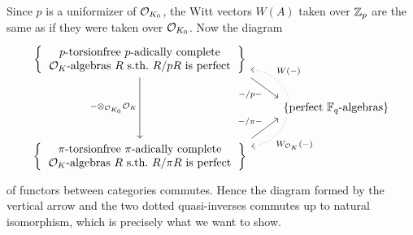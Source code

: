 \documentclass[a4paper, 10pt, oneside, DIV=9, chapterprefix=true, numbers=enddot,bibliography=totoc]{scrbook}
\begin{document}
\begin{proof*}
	Since $p$ is a uniformizer of $\mathcal{O}_{K_0}$, the Witt vectors $W(A)$ taken over $\mathbb{Z}_p$ are the same as if they were taken over $\mathcal{O}_{K_0}$. Now the diagram
	\begin{equation*}
		\begin{tikzcd}[row sep=normal]
			\left\{\begin{tabular}{c}
			$p$-torsionfree $p$-adically complete \\
			$\Oo_K$-algebras $R$ s.th.\ $R/p R$ is perfect
			\end{tabular}
			\right\}\ar[dd,"-\otimes_{\Oo_{K_0}}\Oo_K"{swap}]
			\drar[start anchor=south east, end anchor=north west, "-/p-"{swap}] & \\
			 & \left\{\text{perfect $\IF_q$-algebras}\right\}\ular[start anchor=168, end anchor=355, bend right, dotted, "W(-)"{swap}]\dlar[start anchor=192, end anchor=5, bend left, dotted, "W_{\Oo_K}(-)"]\\
			\left\{\begin{tabular}{c}
			$\pi$-torsionfree $\pi$-adically complete \\
			$\Oo_K$-algebras $R$ s.th.\ $R/\pi R$ is perfect
			\end{tabular}
			\right\}\urar[start anchor=north east, end anchor=south west,"-/\pi-"] & 
		\end{tikzcd}
	\end{equation*}
	of functors between categories commutes. Hence the diagram formed by the vertical arrow and the two dotted quasi-inverses commutes up to natural isomorphism, which is precisely what we want to show.
\end{proof*}


\appendix
\backmatter{}
\printbibliography
\end{document}
